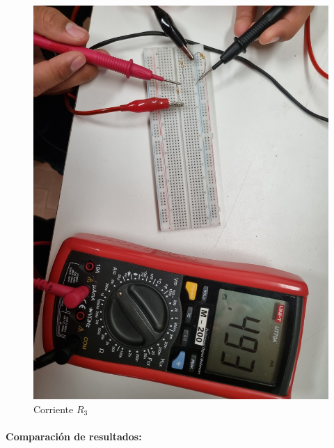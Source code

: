 \documentclass[a4paper,12pt]{article}
\begin{document}
\begin{figure}[H]
\begin{minipage}{0.40\textwidth}
        \includegraphics[width=\linewidth]{imagenes/corrientei3.jpg}
        \caption*{Corriente $R_3$}
    \end{minipage}
\end{figure}

\paragraph{Comparación de resultados:}
\paragraph{}
\end{document}
